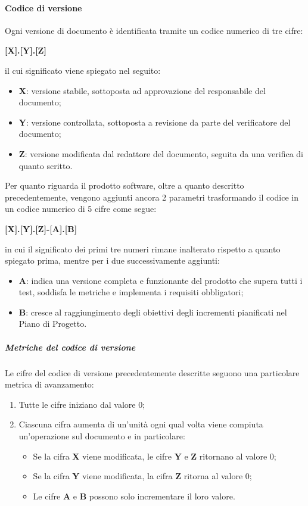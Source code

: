         \paragraph{Codice di versione}
        Ogni versione di documento è identificata tramite un codice numerico di tre cifre:
        \begin{center}
            \Large \textbf{[X].[Y].[Z]}
        \end{center}
        il cui significato viene spiegato nel seguito:
        \begin{itemize}
            \item \textbf{X}: versione stabile, sottoposta ad approvazione del responsabile del documento;
            \item \textbf{Y}: versione controllata, sottoposta a revisione da parte del verificatore del documento;
            \item \textbf{Z}: versione modificata dal redattore del documento, seguita da una verifica di quanto scritto.
        \end{itemize}
        Per quanto riguarda il prodotto software, oltre a quanto descritto precedentemente, vengono aggiunti ancora 2 parametri trasformando il codice in un codice numerico di 5 cifre come segue:
        \begin{center}
            \Large \textbf{[X].[Y].[Z]-[A].[B]}
        \end{center}
        in cui il significato dei primi tre numeri rimane inalterato rispetto a quanto spiegato prima, mentre per i due successivamente aggiunti:
        \begin{itemize}
            \item \textbf{A}: indica una versione completa e funzionante del prodotto che supera tutti i test, soddisfa le metriche e implementa i requisiti obbligatori;
            \item \textbf{B}: cresce al raggiungimento degli obiettivi degli incrementi pianificati nel Piano di Progetto.
        \end{itemize}

            \subparagraph{Metriche del codice di versione}
            Le cifre del codice di versione precedentemente descritte seguono una particolare metrica di avanzamento:
            \begin{enumerate}
                \item Tutte le cifre iniziano dal valore 0;
                \item Ciascuna cifra aumenta di un'unità ogni qual volta viene compiuta un'operazione sul documento e in particolare:
                \begin{itemize}
                    \item Se la cifra \textbf{X} viene modificata, le cifre \textbf{Y} e \textbf{Z} ritornano al valore 0;
                    \item Se la cifra \textbf{Y} viene modificata, la cifra \textbf{Z} ritorna al valore 0;
                    \item Le cifre \textbf{A} e \textbf{B} possono solo incrementare il loro valore.
                \end{itemize}
            \end{enumerate}

